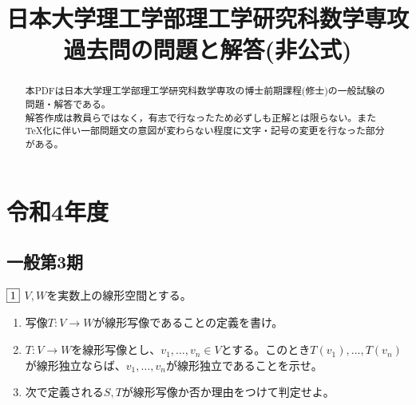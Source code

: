 \documentclass[dvipdfmx]{jsreport}
\title{日本大学理工学部理工学研究科数学専攻 過去問の問題と解答(非公式)}
\date{} %
\newcounter{num}[section]
\begin{document}
\maketitle %

\begin{abstract} %
	本PDFは日本大学理工学部理工学研究科数学専攻の博士前期課程(修士)の一般試験の問題・解答である。\\
	解答作成は教員らではなく，有志で行なったため必ずしも正解とは限らない。また\TeX 化に伴い一部問題文の意図が変わらない程度に文字・記号の変更を行なった部分がある。
\end{abstract}

\tableofcontents %



\chapter{令和4年度}
\section{一般第3期}
\begin{tcolorbox} %
	$\fbox{1}$ $V, W$を実数上の線形空間とする。
\begin{enumerate}
	\item 写像$T\colon V\to W$が線形写像であることの定義を書け。
	\item $T\colon V\to W$を線形写像とし、$v_1, \ldots, v_n\in V$とする。このとき$T(v_1), \ldots, T(v_n)$が線形独立ならば、$v_1, \ldots, v_n$が線形独立であることを示せ。
	\item 次で定義される$S, T$が線形写像か否か理由をつけて判定せよ。
\end{enumerate}
\end{tcolorbox}
\end{document}
